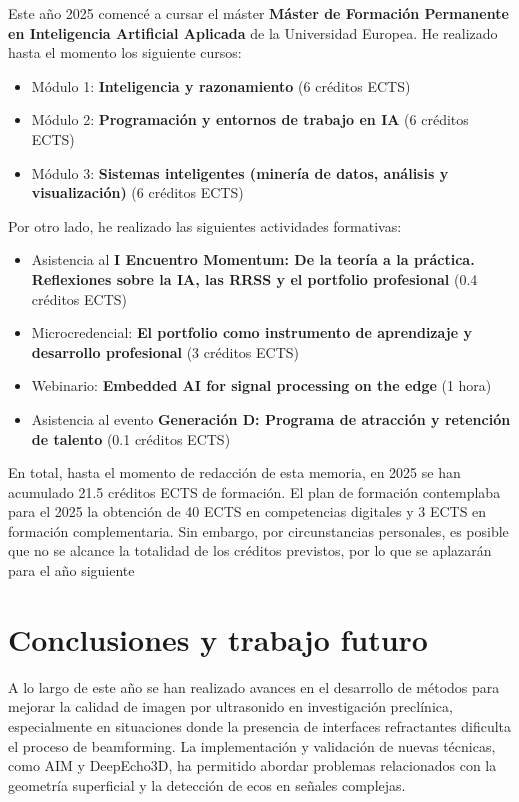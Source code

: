 \documentclass[10pt,a4paper]{article}
\begin{document}
Este año 2025 comencé a cursar el máster \textbf{Máster de Formación Permanente en Inteligencia Artificial Aplicada} de la Universidad Europea. He realizado hasta el momento los siguiente cursos:

\begin{itemize}
	\item Módulo 1: \textbf{Inteligencia y razonamiento} (6 créditos ECTS)
	\item Módulo 2: \textbf{Programación y entornos de trabajo en IA} (6 créditos ECTS)
	\item Módulo 3: \textbf{Sistemas inteligentes (minería de datos, análisis y visualización)} (6 créditos ECTS)
\end{itemize}

Por otro lado, he realizado las siguientes actividades formativas:

\begin{itemize}
	\item Asistencia al \textbf{I Encuentro Momentum: De la teoría a la práctica. Reflexiones sobre la IA, las RRSS
	y el portfolio profesional} (0.4 créditos ECTS)
	\item Microcredencial: \textbf{El portfolio como instrumento de aprendizaje y desarrollo profesional} (3 créditos ECTS)
	\item Webinario: \textbf{Embedded AI for signal  processing on the edge} (1 hora)
	\item Asistencia al evento \textbf{Generación D: Programa de atracción y retención de talento }(0.1 créditos ECTS)
\end{itemize}

En total, hasta el momento de redacción de esta memoria, en 2025 se han acumulado 21.5 créditos ECTS de formación. El plan de formación contemplaba para el 2025 la obtención de 40 ECTS en competencias digitales y 3 ECTS en formación complementaria. Sin embargo, por circunstancias personales, es posible que no se alcance la totalidad de los créditos previstos, por lo que se aplazarán para el año siguiente


\section{Conclusiones y trabajo futuro}\label{sec:conclusiones}

A lo largo de este año se han realizado avances en el desarrollo de métodos para mejorar la calidad de imagen por ultrasonido en investigación preclínica, especialmente en situaciones donde la presencia de interfaces refractantes dificulta el proceso de beamforming. La implementación y validación de nuevas técnicas, como AIM y DeepEcho3D, ha permitido abordar problemas relacionados con la geometría superficial y la detección de ecos en señales complejas.
\end{document}
